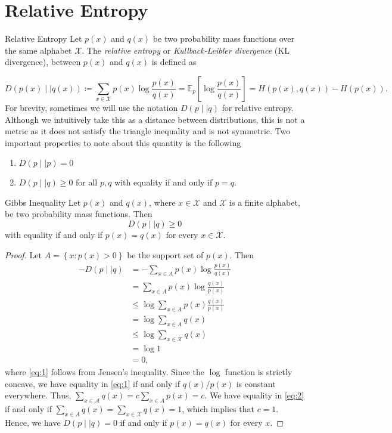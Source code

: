 \section{Relative Entropy}
\begin{defn}{Relative Entropy}{}
Let \(p(x)\) and \(q(x)\) be two probability mass functions over the same alphabet \(\mathcal{X} \). The \textit{relative entropy} or \textit{Kullback-Leibler divergence} (KL divergence), between \(p(x)\) and \(q(x)\) is defined as 

\[
    D(p(x)\mid \mid q(x))\coloneqq \sum_{x \in \mathcal{X} } p(x) \log  \frac{p(x)}{q(x)} = \mathbb{E} _{p} \left[ \log \frac{p(x)}{q(x )}  \right] = H(p(x), q(x)) - H(p(x)).
\]
For brevity, sometimes we will use the notation \(D(p \mid \mid q)\) for relative entropy.  Although we intuitively take this as a distance between distributions, this is not a metric as it does not satisfy the triangle inequality and is not symmetric.   Two important properties to note about this quantity is the following
\begin{enumerate}
    \item \(D(p\mid \mid p)= 0  \) 
    \item \(D(p\mid \mid q) \geq 0\) for all \(p,q\) with equality if and only if \(p = q\).
\end{enumerate}
\end{defn}

\begin{thrm}{Gibbs Inequality}{}
Let \(p(x)\) and \(q(x)\), where \(x\in \mathcal{X} \) and \(\mathcal{X} \) is a finite alphabet, be two probability mass functions. Then \[D(p\mid \mid q) \geq 0\] with equality if and only if \(p(x) = q(x) \text{ for every }  x \in \mathcal{X} \).
\tcbline
\begin{proof}
Let \(A = \left\{ x: p(x) > 0 \right\} \) be the support set of \(p(x)\). Then
\begin{align}
- D(p\mid \mid q) &= - \sum_{x\in A} p(x) \log \frac{p(x)}{q(x)}\\ 
&= \sum_{x\in A} p(x) \log \frac{q(x)}{p(x)}\\
&\leq \log  \sum_{x\in A}  p(x)\frac{q(x)}{p(x)} \label{eq:1}\\ 
&= \log \sum_{x\in A} q(x)\\
&\leq \log \sum_{x\in \mathcal{X} }q(x)\label{eq:2}\\ 
&= \log 1\\  
&= 0,     
\end{align}
where \eqref{eq:1} follows from Jensen's inequality. Since the \(\log \) function is strictly concave, we have equality in \eqref{eq:1} if and only if \(q(x) / p(x)\) is  constant everywhere. Thus, \(\sum_{x \in \mathcal{A} }q(x) = c\sum_{x \in A}p(x) = c  \). We have equality in \eqref{eq:2} if and only if \(\sum_{x \in A}q(x) = \sum_{x \in \mathcal{X} }q(x) = 1  \), which implies that \(c = 1\). Hence, we have \(D(p \mid \mid q) = 0\) if and only if \(p(x) = q(x)\) for every \(x\).    
\end{proof}

\end{thrm}


